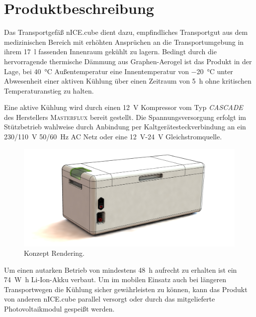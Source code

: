\chapter{Produktbeschreibung}
	Das Transportgefäß \frq nICE.cube\flq{} dient dazu, empfindliches Transportgut aus dem medizinischen Bereich mit erhöhten Ansprüchen an die Transportumgebung
	in ihrem \SI{17}{\litre} fassenden Innenraum gekühlt zu lagern. Bedingt durch die hervorragende thermische Dämmung aus Graphen-Aerogel ist das Produkt
	in der Lage, bei \SI{40}{\celsius} Außentemperatur eine Innentemperatur von \SI{-20}{\celsius} unter Abwesenheit einer aktiven Kühlung über einen Zeitraum
	von \SI{5}{\hour} ohne kritischen Temperaturanstieg zu halten.\par\smallskip

	Eine aktive Kühlung wird durch einen \SI{12}{\volt} Kompressor vom Typ \textit{CASCADE} des Herstellers \textsc{Masterflux} bereit gestellt. Die Spannungsversorgung
	erfolgt im Stützbetrieb wahlweise durch Anbindung per Kaltgerätesteckverbindung an ein \SI{230/110}{\volt} \SI{50/60}{\hertz} AC Netz oder eine \SI{12}{\volt}-\SI{24}{\volt} Gleichstromquelle.\par\smallskip

	\begin{figure}[h]
		\centering
		\includegraphics[width=\textwidth]{assets/box_side_render.png}
		\caption[Konzept Rendering]{Konzept Rendering.}
		\label{fig:box side render}
	\end{figure}
	Um einen autarken Betrieb von mindestens \SI{48}{\hour} aufrecht zu erhalten ist ein \SI{74}{\watt\hour} Li-Ion-Akku verbaut. Um im mobilen Einsatz auch bei längeren
	Transportwegen die Kühlung sicher gewährleisten zu können, kann das Produkt von anderen \frq nICE.cube\flq{} parallel versorgt oder durch das mitgelieferte Photovoltaikmodul gespeißt werden.\par\smallskip

